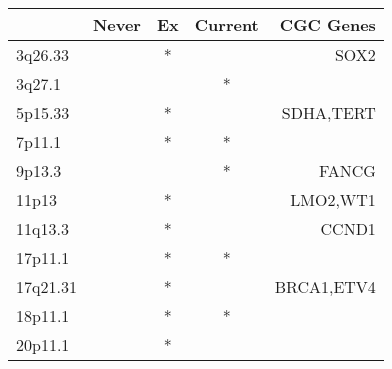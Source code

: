 \begin{tabular}{lcccr}
\toprule
{} & Never & Ex & Current &   CGC Genes \\
\midrule
3q26.33  &       &  * &         &        SOX2 \\
3q27.1   &       &    &       * &             \\
5p15.33  &       &  * &         &   SDHA,TERT \\
7p11.1   &       &  * &       * &             \\
9p13.3   &       &    &       * &       FANCG \\
11p13    &       &  * &         &    LMO2,WT1 \\
11q13.3  &       &  * &         &       CCND1 \\
17p11.1  &       &  * &       * &             \\
17q21.31 &       &  * &         &  BRCA1,ETV4 \\
18p11.1  &       &  * &       * &             \\
20p11.1  &       &  * &         &             \\
\bottomrule
\end{tabular}
